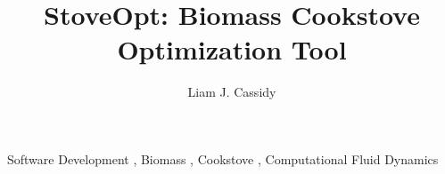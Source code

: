 \documentclass[3p,times,twocolumn]{elsarticle}
\begin{document}
\begin{frontmatter}



\dochead{}

\title{StoveOpt: Biomass Cookstove Optimization Tool}


\author{Liam J. Cassidy}

\address{2000 SW Monroe Ave, 342 Rogers Hall, Covallis, OR 97331}


\begin{abstract}
\end{abstract}

\begin{keyword}


Software Development \sep%
Biomass \sep%
Cookstove \sep%
Computational Fluid Dynamics
\end{keyword}
\newline
\newline


\end{frontmatter}
\newline

\end{document}
